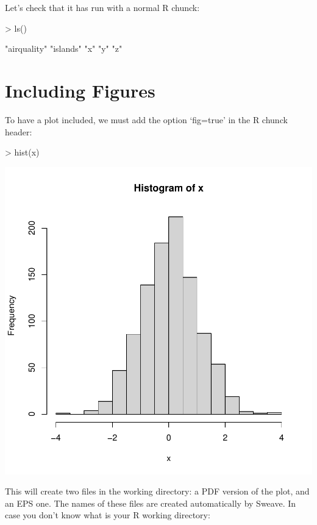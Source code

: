 \documentclass[a4paper]{article}
\begin{document}
Let's check that it has run with a normal R chunck:

\begin{Schunk}
\begin{Sinput}
> ls()
\end{Sinput}
\begin{Soutput}
[1] "airquality" "islands"    "x"          "y"          "z"         
\end{Soutput}
\end{Schunk}

\section{Including Figures}

To have a plot included, we must add the option `fig=true' in the R
chunck header:

\begin{Schunk}
\begin{Sinput}
> hist(x)
\end{Sinput}
\end{Schunk}
\includegraphics{Little_Sweave-005}

This will create two files in the working directory: a PDF version of
the plot, and an EPS one. The names of these files are created
automatically by Sweave. In case you don't know what is your R working directory:
\end{document}
